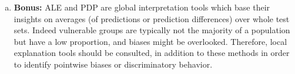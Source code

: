 {\begin{enumerate}[a)]
Overall, the following ordering of \texttt{personal\_status\_sex} was returned by the method: 
% 



The ordering seems to be feasible, since categories including females are close to each other 
and also categories with males. 
Also the ordering of males according to their relationship status seems to make sense, since typically 
the process is: single, then married and then divorced :-).

\item \textbf{Bonus:} ALE and PDP are global interpretation tools which base their insights on averages (of predictions or 
prediction differences) over whole test sets.
Indeed vulnerable groups are typically not the majority of a population but have a low proportion, 
and biases might be overlooked.
Therefore, local explanation tools should be consulted, in addition to these methods in order to 
identify pointwise biases or discriminatory behavior.

\end{enumerate}
}